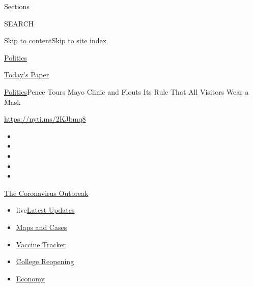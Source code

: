 Sections

SEARCH

\protect\hyperlink{site-content}{Skip to
content}\protect\hyperlink{site-index}{Skip to site index}

\href{https://www.nytimes.com/section/politics}{Politics}

\href{https://myaccount.nytimes.com/auth/login?response_type=cookie\&client_id=vi}{}

\href{https://www.nytimes.com/section/todayspaper}{Today's Paper}

\href{/section/politics}{Politics}\textbar{}Pence Tours Mayo Clinic and
Flouts Its Rule That All Visitors Wear a Mask

\url{https://nyti.ms/2KJbmq8}

\begin{itemize}
\item
\item
\item
\item
\item
\end{itemize}

\href{https://www.nytimes.com/news-event/coronavirus?action=click\&pgtype=Article\&state=default\&region=TOP_BANNER\&context=storylines_menu}{The
Coronavirus Outbreak}

\begin{itemize}
\tightlist
\item
  live\href{https://www.nytimes.com/2020/08/04/world/coronavirus-cases.html?action=click\&pgtype=Article\&state=default\&region=TOP_BANNER\&context=storylines_menu}{Latest
  Updates}
\item
  \href{https://www.nytimes.com/interactive/2020/us/coronavirus-us-cases.html?action=click\&pgtype=Article\&state=default\&region=TOP_BANNER\&context=storylines_menu}{Maps
  and Cases}
\item
  \href{https://www.nytimes.com/interactive/2020/science/coronavirus-vaccine-tracker.html?action=click\&pgtype=Article\&state=default\&region=TOP_BANNER\&context=storylines_menu}{Vaccine
  Tracker}
\item
  \href{https://www.nytimes.com/2020/08/02/us/covid-college-reopening.html?action=click\&pgtype=Article\&state=default\&region=TOP_BANNER\&context=storylines_menu}{College
  Reopening}
\item
  \href{https://www.nytimes.com/live/2020/08/04/business/stock-market-today-coronavirus?action=click\&pgtype=Article\&state=default\&region=TOP_BANNER\&context=storylines_menu}{Economy}
\end{itemize}

